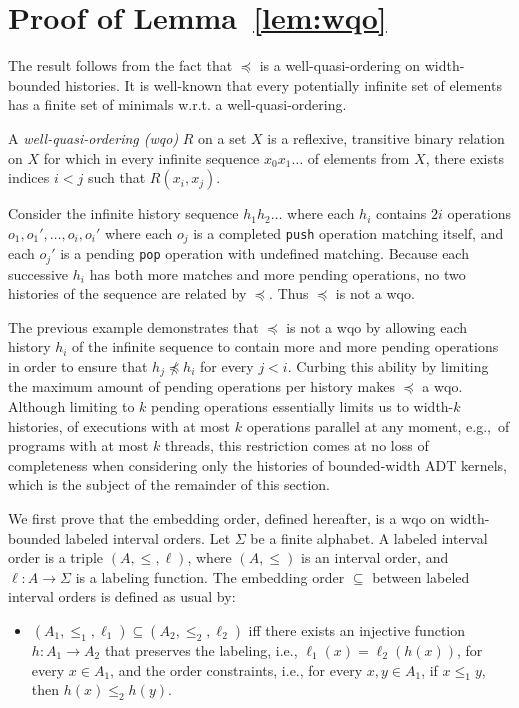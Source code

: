 \appendix
\section{Proof of Lemma~\ref{lem:wqo}}

The result follows from the fact that $\preceq$ is a well-quasi-ordering on width-bounded histories.
It is well-known that every potentially infinite set of elements has a finite set of minimals w.r.t. a well-quasi-ordering.

A \emph{well-quasi-ordering (wqo)} $R$ on a set $X$ is a reflexive, transitive
binary relation on $X$ for which in every infinite sequence $x_0 x_1 \ldots$ of
elements from $X$, there exists indices $i < j$ such that $R(x_i,x_j)$.

\begin{example}

  Consider the infinite history sequence $h_1 h_2 \ldots$ where each $h_i$
  contains $2i$ operations $o_1, o_1', \ldots, o_i, o_i'$ where each $o_j$ is a
  completed {\tt push} operation matching itself, and each $o_j'$ is a pending
  {\tt pop} operation with undefined matching. Because each successive $h_i$
  has both more matches and more pending operations, no two histories of the
  sequence are related by $\preceq$. Thus $\preceq$ is not a wqo.

\end{example}

The previous example demonstrates that $\preceq$ is not a wqo by allowing each
history $h_i$ of the infinite sequence to contain more and more pending
operations in order to ensure that $h_j \not\preceq h_i$ for every $j < i$.
Curbing this ability by limiting the maximum amount of pending operations per
history makes $\preceq$ a wqo. Although limiting to $k$ pending operations
essentially limits us to width-$k$ histories, of executions with at most $k$
operations parallel at any moment, e.g.,~of programs with at most $k$ threads,
this restriction comes at no loss of completeness when considering only the
histories of bounded-width ADT kernels, which is the subject of the remainder
of this section.

We first prove that the embedding order, defined hereafter, is a wqo on width-bounded
labeled interval orders.
Let $\Sigma$ be a finite alphabet. A labeled interval order is a triple $(A,\leq,\ell)$, where $(A,\leq)$ is an interval 
order, and $\ell:A\rightarrow \Sigma$ is a labeling function. The embedding order $\subseteq$ between labeled interval orders is defined as
usual by:
\begin{itemize}
	\item $(A_1,\leq_1,\ell_1)\subseteq (A_2,\leq_2,\ell_2)$ iff there exists an injective function $h:A_1\rightarrow A_2$ that 
	preserves the labeling, i.e., $\ell_1(x)=\ell_2(h(x))$, for every $x\in A_1$, and the order constraints, i.e.,
	for every $x,y\in A_1$, if $x \leq_1 y$, then $h(x)\leq_2 h(y)$.
\end{itemize}

